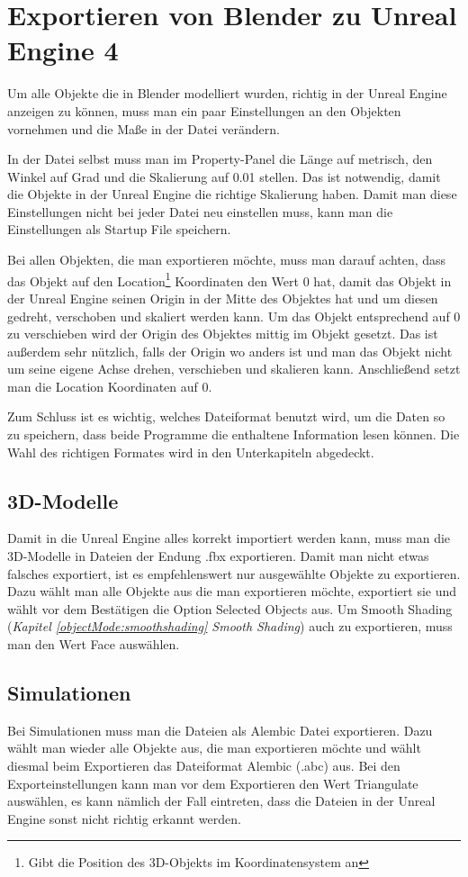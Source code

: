 \section{Exportieren von Blender zu Unreal Engine 4}
\label{Exportieren_von_Blender_zu_Unreal_Engine_4:ref1}
Um alle Objekte die in Blender modelliert wurden, richtig in der Unreal Engine anzeigen zu können, muss man ein paar
Einstellungen an den Objekten vornehmen und die Maße in der Datei verändern.

In der Datei selbst muss man im Property-Panel die Länge auf metrisch, den Winkel auf Grad und die Skalierung auf 0.01 stellen.
Das ist notwendig, damit die Objekte in der Unreal Engine die richtige Skalierung haben. Damit man diese Einstellungen nicht bei
jeder Datei neu einstellen muss, kann man die Einstellungen als Startup File speichern.

Bei allen Objekten, die man exportieren möchte, muss man darauf achten, dass das Objekt auf den Location\footnote{Gibt die Position des 3D-Objekts im Koordinatensystem an} Koordinaten
den Wert 0 hat, damit das Objekt in der Unreal Engine seinen Origin in der Mitte des Objektes hat und um diesen gedreht, verschoben und skaliert werden kann.
Um das Objekt entsprechend auf 0 zu verschieben wird der Origin des Objektes mittig im Objekt gesetzt. Das ist außerdem sehr nützlich, falls der Origin wo anders ist und man das
Objekt nicht um seine eigene Achse drehen, verschieben und skalieren kann. Anschließend setzt man die Location Koordinaten auf 0.

Zum Schluss ist es wichtig, welches Dateiformat benutzt wird, um die Daten so zu speichern, dass beide Programme die enthaltene
Information lesen können. Die Wahl des richtigen Formates wird in den Unterkapiteln abgedeckt.

\subsection{3D-Modelle}
Damit in die Unreal Engine alles korrekt importiert werden kann, muss man die 3D-Modelle in Dateien der Endung .fbx exportieren.
Damit man nicht etwas falsches exportiert, ist es empfehlenswert nur ausgewählte Objekte zu exportieren. Dazu wählt man alle
Objekte aus die man exportieren möchte, exportiert sie und wählt vor dem Bestätigen die Option Selected Objects aus.
Um Smooth Shading (\textit{Kapitel \ref{objectMode:smoothshading} \dq Smooth Shading\dq})
auch zu exportieren, muss man den Wert Face auswählen.

\subsection{Simulationen}
\label{Simulation_Heading}
Bei Simulationen muss man die Dateien als Alembic Datei exportieren. Dazu wählt man wieder alle Objekte aus, die man exportieren möchte und
wählt diesmal beim Exportieren das Dateiformat Alembic (.abc) aus. Bei den Exporteinstellungen kann man vor dem Exportieren den Wert Triangulate auswählen,
es kann nämlich der Fall eintreten, dass die Dateien in der Unreal Engine sonst nicht richtig erkannt werden.